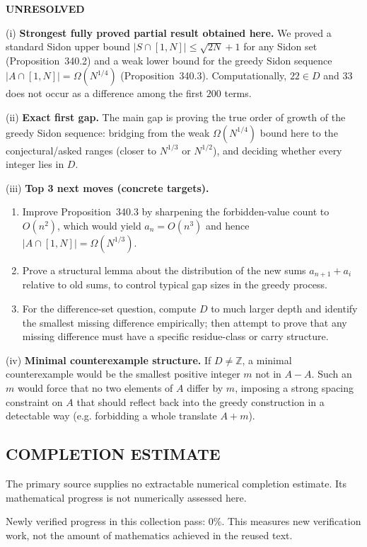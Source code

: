 \noindent\textbf{UNRESOLVED}

\smallskip
\noindent (i) \textbf{Strongest fully proved partial result obtained here.}
We proved a standard Sidon upper bound $|S\cap[1,N]|\le \sqrt{2N}+1$ for any Sidon set (Proposition~340.2) and a weak lower bound for the greedy Sidon sequence $|A\cap[1,N]|=\Omega(N^{1/4})$ (Proposition~340.3). Computationally, $22\in D$ and $33$ does not occur as a difference among the first $200$ terms.

\smallskip
\noindent (ii) \textbf{Exact first gap.}
The main gap is proving the true order of growth of the greedy Sidon sequence: bridging from the weak $\Omega(N^{1/4})$ bound here to the conjectural/asked ranges (closer to $N^{1/3}$ or $N^{1/2}$), and deciding whether every integer lies in $D$.

\smallskip
\noindent (iii) \textbf{Top 3 next moves (concrete targets).}
\begin{enumerate}
\item Improve Proposition~340.3 by sharpening the forbidden-value count to $O(n^2)$, which would yield $a_n=O(n^3)$ and hence $|A\cap[1,N]|=\Omega(N^{1/3})$.
\item Prove a structural lemma about the distribution of the new sums $a_{n+1}+a_i$ relative to old sums, to control typical gap sizes in the greedy process.
\item For the difference-set question, compute $D$ to much larger depth and identify the smallest missing difference empirically; then attempt to prove that any missing difference must have a specific residue-class or carry structure.
\end{enumerate}

\smallskip
\noindent (iv) \textbf{Minimal counterexample structure.}
If $D\ne\mathbb{Z}$, a minimal counterexample would be the smallest positive integer $m$ not in $A-A$. Such an $m$ would force that no two elements of $A$ differ by $m$, imposing a strong spacing constraint on $A$ that should reflect back into the greedy construction in a detectable way (e.g. forbidding a whole translate $A+m$).




\subsection*{COMPLETION ESTIMATE}
The primary source supplies no extractable numerical completion estimate. Its mathematical progress is not numerically assessed here.

Newly verified progress in this collection pass: $0\%$. This measures new verification work, not the amount of mathematics achieved in the reused text.
